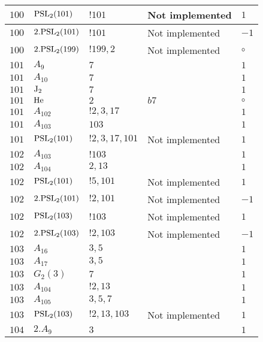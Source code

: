 \documentclass[a4paper, 11pt]{article}
\begin{document}
\begin{longtable}{lllll}
        $ 100 $ & $ {\rm PSL}_{2}(101) $ & $ !101 $ &  Not implemented & $ 1$ \\ \hline
        $ 100 $ & $ 2.{\rm PSL}_{2}(101) $ & $ !101 $ &  Not implemented & $ -1$ \\ \hline
        $ 100 $ & $ 2.{\rm PSL}_{2}(199) $ & $ !199, 2 $ &  Not implemented &  $\circ$ \\ \hline
        $ 101 $ & $ A_{9} $ & $ 7 $ & $ ~ $ & $ 1$ \\ \hline
        $ 101 $ & $ A_{10} $ & $ 7 $ & $ ~ $ & $ 1$ \\ \hline
        $ 101 $ & $ {\rm J}_2 $ & $ 7 $ & $ ~ $ & $ 1$ \\ \hline
        $ 101 $ & $ {\rm He} $ & $ 2 $ & $ b7 $ &  $\circ$ \\ \hline
        $ 101 $ & $ A_{102} $ & $ !2, 3, 17 $ & $ ~ $ & $ 1$ \\ \hline
        $ 101 $ & $ A_{103} $ & $ 103 $ & $ ~ $ & $ 1$ \\ \hline
        $ 101 $ & $ {\rm PSL}_{2}(101) $ & $ !2, 3, 17, 101 $ &  Not implemented & $ 1$ \\ \hline
        $ 102 $ & $ A_{103} $ & $ !103 $ & $ ~ $ & $ 1$ \\ \hline
        $ 102 $ & $ A_{104} $ & $ 2, 13 $ & $ ~ $ & $ 1$ \\ \hline
        $ 102 $ & $ {\rm PSL}_{2}(101) $ & $ !5, 101 $ &  Not implemented & $ 1$ \\ \hline
        $ 102 $ & $ 2.{\rm PSL}_{2}(101) $ & $ !2, 101 $ &  Not implemented & $ -1$ \\ \hline
        $ 102 $ & $ {\rm PSL}_{2}(103) $ & $ !103 $ &  Not implemented & $ 1$ \\ \hline
        $ 102 $ & $ 2.{\rm PSL}_{2}(103) $ & $ !2, 103 $ &  Not implemented & $ -1$ \\ \hline
        $ 103 $ & $ A_{16} $ & $ 3, 5 $ & $ ~ $ & $ 1$ \\ \hline
        $ 103 $ & $ A_{17} $ & $ 3,5 $ & $ ~ $ & $ 1$ \\ \hline
        $ 103 $ & $ G_{2}(3) $ & $ 7 $ & $ ~ $ & $ 1$ \\ \hline
        $ 103 $ & $ A_{104} $ & $ !2, 13 $ & $ ~ $ & $ 1$ \\ \hline
        $ 103 $ & $ A_{105} $ & $ 3, 5, 7 $ & $ ~ $ & $ 1$ \\ \hline
        $ 103 $ & $ {\rm PSL}_{2}(103) $ & $ !2, 13, 103 $ &  Not implemented & $ 1$ \\ \hline
        $ 104 $ & $ 2.A_{9} $ & $ 3 $ & $ ~ $ & $ 1$ \\ \hline

\end{longtable}
\end{document}
